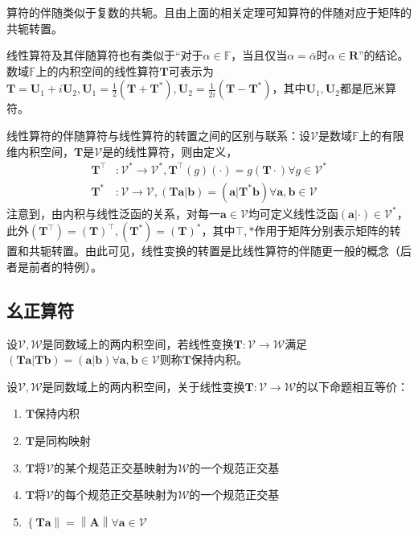 \documentclass[main.tex]{subfiles}
\begin{document}
算符的伴随类似于复数的共轭。且由上面的相关定理可知算符的伴随对应于矩阵的共轭转置。

线性算符及其伴随算符也有类似于“对于$\alpha\in\mathbb{F}$，当且仅当$\alpha=\overline{\alpha}$时$\alpha\in\mathbf{R}$”的结论。数域$\mathbb{F}$上的内积空间的线性算符$\mathbf{T}$可表示为$\mathbf{T}=\mathbf{U}_1+i\mathbf{U}_2,\mathbf{U}_1=\frac{1}{2}\left(\mathbf{T}+\mathbf{T}^*\right),\mathbf{U}_2=\frac{1}{2i}\left(\mathbf{T}-\mathbf{T}^*\right)$，其中$\mathbf{U}_1,\mathbf{U}_2$都是厄米算符。

线性算符的伴随算符与线性算符的转置之间的区别与联系：设$\mathcal{V}$是数域$\mathbb{F}$上的有限维内积空间，$\mathbf{T}$是$\mathcal{V}$是的线性算符，则由定义，
\begin{align*}\mathbf{T}^\intercal&:\mathcal{V}^*\rightarrow\mathcal{V}^*,\mathbf{T}^\intercal\left(g\right)\left(\cdot\right)=g\left(\mathbf{T}\cdot\right)\forall g\in\mathcal{V}^*\\
\mathbf{T}^*&:\mathcal{V}\rightarrow\mathcal{V},\left(\mathbf{Ta}|\mathbf{b}\right)=\left(\mathbf{a}|\mathbf{T}^*\mathbf{b}\right)\forall\mathbf{a},\mathbf{b}\in\mathcal{V}
\end{align*}
注意到，由内积与线性泛函的关系，对每一$\mathbf{a}\in\mathcal{V}$均可定义线性泛函$\left(\mathbf{a}|\cdot\right)\in\mathcal{V}^*$，此外$\left(\mathbf{T}^\intercal\right)=\left(\mathbf{T}\right)^\intercal,\left(\mathbf{T}^*\right)=\left(\mathbf{T}\right)^*$，其中$\intercal,*$作用于矩阵分别表示矩阵的转置和共轭转置。由此可见，线性变换的转置是比线性算符的伴随更一般的概念（后者是前者的特例）。

\subsection{幺正算符}
\begin{definition}[保持内积]
设$\mathcal{V},\mathcal{W}$是同数域上的两内积空间，若线性变换$\mathbf{T}:\mathcal{V}\rightarrow\mathcal{W}$满足$\left(\mathbf{Ta}|\mathbf{Tb}\right)=\left(\mathbf{a}|\mathbf{b}\right)\forall\mathbf{a},\mathbf{b}\in\mathcal{V}$则称$\mathbf{T}$保持内积。
\end{definition}

\begin{theorem}
设$\mathcal{V},\mathcal{W}$是同数域上的两内积空间，关于线性变换$\mathbf{T}:\mathcal{V}\rightarrow\mathcal{W}$的以下命题相互等价：
\begin{enumerate}
    \item $\mathbf{T}$保持内积
    \item $\mathbf{T}$是同构映射
    \item $\mathbf{T}$将$\mathcal{V}$的某个规范正交基映射为$\mathcal{W}$的一个规范正交基
    \item $\mathbf{T}$将$\mathcal{V}$的每个规范正交基映射为$\mathcal{W}$的一个规范正交基
    \item $\left\{\mathbf{Ta}\right\|=\left\|\mathbf{A}\right\|\forall\mathbf{a}\in\mathcal{V}$
\end{enumerate}
\end{theorem}
\end{document}
